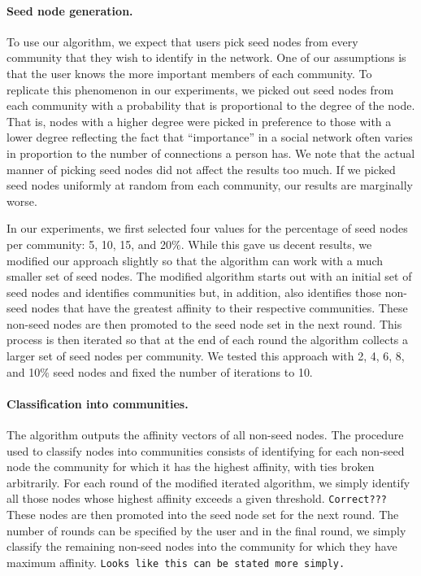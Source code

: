 \paragraph{Seed node generation.} 
To use our algorithm, we expect that users pick seed nodes from 
every community that they wish to identify in the network. One of our assumptions is that
the user knows the more important members of each community. To replicate 
this phenomenon in our experiments, we picked out seed nodes from each community 
with a probability that is proportional to the degree of the node. That is, nodes
with a higher degree were picked in preference to those with a lower degree reflecting the 
fact that ``importance'' in a social network often varies in proportion to the number of 
connections a person has. We note that the actual manner of picking seed nodes did not 
affect the results too much. If we picked seed nodes uniformly at random from each community, 
our results are marginally worse. 

In our experiments, we first selected four values for the percentage of seed nodes 
per community: 5, 10, 15, and 20$\%$. While this gave us decent results, we modified our 
approach slightly so that the algorithm can work with a much smaller set of seed nodes. 
The modified algorithm starts out with an initial set of seed nodes and identifies 
communities but, in addition, also identifies those non-seed nodes that have the 
greatest affinity to their respective communities. These non-seed nodes are then promoted 
to the seed node set in the next round. This process is then iterated so that at the end of each 
round the algorithm collects a larger set of seed nodes per community. We tested this approach with 
2, 4, 6, 8, and 10$\%$ seed nodes and fixed the number of iterations to 10. 

\paragraph{Classification into communities.}
The algorithm outputs the affinity vectors of all non-seed nodes. The procedure 
used to classify nodes into communities consists of identifying for each non-seed 
node the community for which it has the highest affinity, with ties broken arbitrarily. 
For each round of the modified iterated algorithm, we simply identify all those nodes 
whose highest affinity exceeds a given threshold. \texttt{Correct???} These nodes are then 
promoted into the seed node set for the next round. The number of rounds can be specified by 
the user and in the final round, we simply classify the remaining non-seed nodes into the community
for which they have maximum affinity. \texttt{Looks like this can be stated more simply.}

